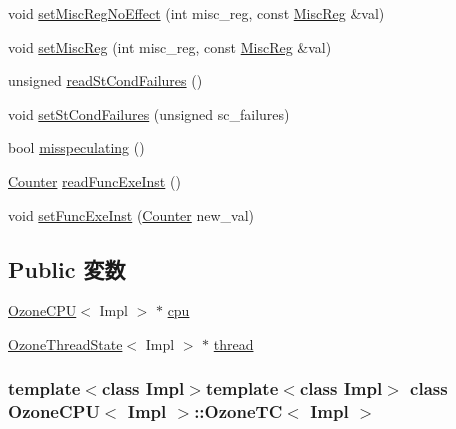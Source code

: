 \begin{DoxyCompactItemize}
\item 
void \hyperlink{classOzoneCPU_1_1OzoneTC_a763517aaea2f3decbc1ef9d064216b6f}{setMiscRegNoEffect} (int misc\_\-reg, const \hyperlink{classThreadContext_aaf5f073a387db0556d1db4bcc45428bc}{MiscReg} \&val)
\item 
void \hyperlink{classOzoneCPU_1_1OzoneTC_a1877dde4f3eb17a8b7d33ea40176c148}{setMiscReg} (int misc\_\-reg, const \hyperlink{classThreadContext_aaf5f073a387db0556d1db4bcc45428bc}{MiscReg} \&val)
\item 
unsigned \hyperlink{classOzoneCPU_1_1OzoneTC_a25b995a791e41965e088d8bf3f2bf859}{readStCondFailures} ()
\item 
void \hyperlink{classOzoneCPU_1_1OzoneTC_abbe779fa43c72cd485ddb736ab17ff61}{setStCondFailures} (unsigned sc\_\-failures)
\item 
bool \hyperlink{classOzoneCPU_1_1OzoneTC_a99768639c728ee835cce54b8b42b3d8f}{misspeculating} ()
\item 
\hyperlink{base_2types_8hh_ae1475755791765b8e6f6a8bb091e273e}{Counter} \hyperlink{classOzoneCPU_1_1OzoneTC_a2b0bef6e1b1ac24e9322fbd09a511d11}{readFuncExeInst} ()
\item 
void \hyperlink{classOzoneCPU_1_1OzoneTC_aa1adc19bd2d6fd2ca03c47d5fd6561a2}{setFuncExeInst} (\hyperlink{base_2types_8hh_ae1475755791765b8e6f6a8bb091e273e}{Counter} new\_\-val)
\end{DoxyCompactItemize}
\subsection*{Public 変数}
\begin{DoxyCompactItemize}
\item 
\hyperlink{classOzoneCPU}{OzoneCPU}$<$ Impl $>$ $\ast$ \hyperlink{classOzoneCPU_1_1OzoneTC_a80c31e32e6a8233d87983f7843046091}{cpu}
\item 
\hyperlink{structOzoneThreadState}{OzoneThreadState}$<$ Impl $>$ $\ast$ \hyperlink{classOzoneCPU_1_1OzoneTC_ab6f834310107fd693035eba2eeca583f}{thread}
\end{DoxyCompactItemize}
\subsubsection*{template$<$class Impl$>$template$<$class Impl$>$ class OzoneCPU$<$ Impl $>$::OzoneTC$<$ Impl $>$}



